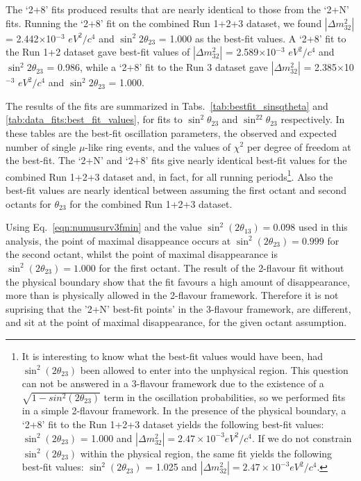 The `2+8' fits produced results that are nearly identical to those from the `2+N' fits. Running the 
`2+8' fit on the combined Run 1+2+3 dataset, we found $|\Delta m^{2}_{32}|$ = 
2.442$\times$10$^{-3}$ $eV^{2}/c^{4}$ and $\sin^{2}2\theta_{23}$ = 1.000 as the best-fit values.
A `2+8' fit to the Run 1+2 dataset gave best-fit values of $|\Delta m^{2}_{32}|$ = 2.589$\times$10$^{-3}$ $eV^{2}/c^{4}$ 
and $\sin^{2}2\theta_{23}$ = 0.986, while a `2+8' fit to the Run 3 dataset gave $|\Delta m^{2}_{32}|$ = 
2.385$\times$10$^{-3}$ $eV^{2}/c^{4}$ and $\sin^{2}2\theta_{23}$ = 1.000.


The results of the fits are summarized in Tabs.\ \ref{tab:bestfit_sinsqtheta} and \ref{tab:data_fits:best_fit_values},
for fits to $\sin^2\theta_{23}$ and $\sin^22\theta_{23}$ respectively. In these tables are 
the best-fit oscillation parameters, the observed and expected number of single $\mu$-like ring events,
and the values of $\chi^{2}$ per degree of freedom at the best-fit.
The `2+N' and `2+8' fits give nearly identical best-fit values for the combined Run 1+2+3 dataset and, in fact,
for all running periods\footnote{
  It is interesting to know what the best-fit values would have been,
  had  $\sin^{2}(2\theta_{23})$ been allowed to enter into the unphysical region.
  This question can not be answered in a 3-flavour
  framework due to the existence of a $\sqrt{1-sin^{2}(2\theta_{23})}$ term in the oscillation probabilities,
  so we performed fits in a simple 2-flavour framework.
  In the presence of the physical boundary, a `2+8' fit to the Run 1+2+3 dataset 
  yields the following best-fit values:
  $\sin^{2}(2\theta_{23})$ = 1.000 and
  $|\Delta m^2_{32}| = 2.47 \times 10^{-3} eV^2/c^4$.
  If we do not constrain $\sin^{2}(2\theta_{23})$ within the physical region,
  the same fit yields the following best-fit values:
  $\sin^{2}(2\theta_{23})$ = 1.025 and
  $|\Delta m^2_{32}| = 2.47 \times 10^{-3} eV^2/c^4$.
}. Also the best-fit values are nearly identical between assuming the first octant and second octants for $\theta_{23}$ 
for the combined Run 1+2+3 dataset.

Using Eq.\ \ref{eqn:numusurv3fmin} and the value $\sin^2(2\theta_{13}) = 0.098$ used in this analysis,
the point of maximal disappeance occurs at $\sin^2(2\theta_{23}) = 0.999$ for the second octant, 
whilst the point of maximal disappearance is $\sin^2(2\theta_{23}) = 1.000$ for the first octant.
The result of the 2-flavour fit without the physical boundary show that the fit favours
a high amount of disappearance, more than is physically allowed in the 2-flavour framework.
Therefore it is not suprising that the '2+N' best-fit points' in the 3-flavour framework, are different,
and sit at the point of maximal disappearance, for the given octant assumption.

